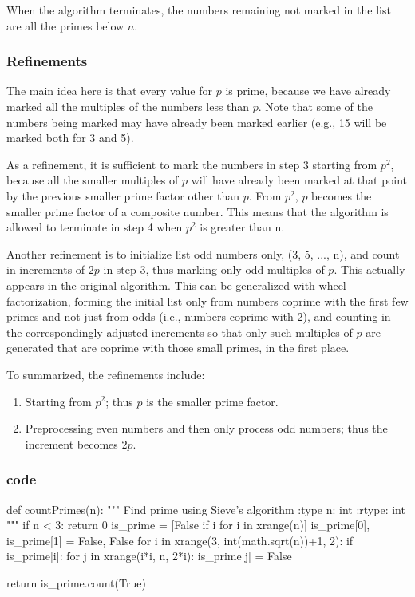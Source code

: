 When the algorithm terminates, the numbers remaining not marked in the list are all the primes below $n$.

\subsubsection{Refinements}
The main idea here is that every value for $p$ is prime, because we have already marked all the multiples of the numbers less than $p$. Note that some of the numbers being marked may have already been marked earlier (e.g., 15 will be marked both for 3 and 5).

As a refinement, it is sufficient to mark the numbers in step 3 starting from $p^2$, because all the smaller multiples of $p$ will have already been marked at that point by the previous smaller prime factor other than $p$. From $p^2$, $p$ becomes the smaller prime factor of a composite number. This means that the algorithm is allowed to terminate in step 4 when $p^2$ is greater than n.

Another refinement is to initialize list odd numbers only, (3, 5, ..., n), and count in increments of $2p$ in step 3, thus marking only odd multiples of $p$. This actually appears in the original algorithm. This can be generalized with wheel factorization, forming the initial list only from numbers coprime with the first few primes and not just from odds (i.e., numbers coprime with 2), and counting in the correspondingly adjusted increments so that only such multiples of $p$ are generated that are coprime with those small primes, in the first place.

To summarized, the refinements include:
\begin{enumerate}
\item Starting from $p^2$; thus $p$ is the smaller prime factor. 
\item Preprocessing even numbers and then only process odd numbers; thus the increment becomes $2p$.
\end{enumerate}

\subsubsection{code}
\begin{python}
def countPrimes(n):
    """
    Find prime using Sieve's algorithm
    :type n: int
    :rtype: int
    """
    if n < 3: return 0
    is_prime = [False if i%
                for i in xrange(n)]
    is_prime[0], is_prime[1] = False, False
    for i in xrange(3, int(math.sqrt(n))+1, 2):
        if is_prime[i]:
            for j in xrange(i*i, n, 2*i):
                is_prime[j] = False

    return is_prime.count(True)
\end{python}

